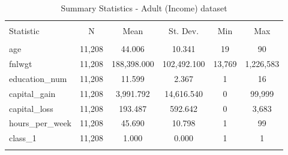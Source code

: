 
\begin{table}[H] \centering 
  \caption{Summary Statistics - Adult (Income) dataset} 
  \label{tbl:summary_stats_50k_2} 
\begin{tabular}{@{\extracolsep{5pt}}lccccc} 
\\[-1.8ex]\hline 
\hline \\[-1.8ex] 
Statistic & \multicolumn{1}{c}{N} & \multicolumn{1}{c}{Mean} & \multicolumn{1}{c}{St. Dev.} & \multicolumn{1}{c}{Min} & \multicolumn{1}{c}{Max} \\ 
\hline \\[-1.8ex] 
age & 11,208 & 44.006 & 10.341 & 19 & 90 \\ 
fnlwgt & 11,208 & 188,398.000 & 102,492.100 & 13,769 & 1,226,583 \\ 
education\_num & 11,208 & 11.599 & 2.367 & 1 & 16 \\ 
capital\_gain & 11,208 & 3,991.792 & 14,616.540 & 0 & 99,999 \\ 
capital\_loss & 11,208 & 193.487 & 592.642 & 0 & 3,683 \\ 
hours\_per\_week & 11,208 & 45.690 & 10.798 & 1 & 99 \\ 
class\_1 & 11,208 & 1.000 & 0.000 & 1 & 1 \\ 
\hline \\[-1.8ex] 
\end{tabular} 
\end{table} 
